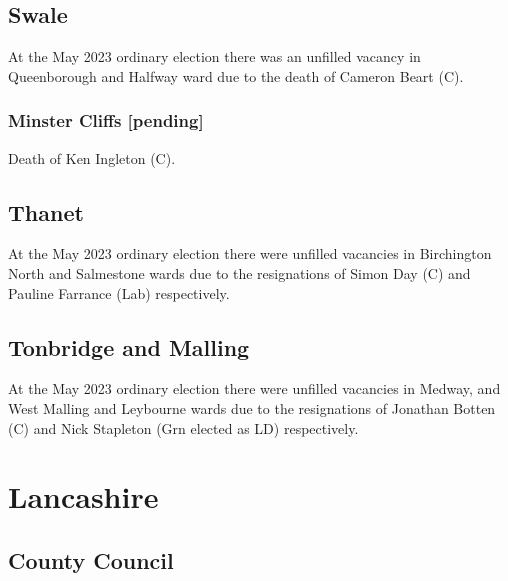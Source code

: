\documentclass[a4paper,openany]{book}
\begin{document}
\begin{resultsiii}
\subsection*{Swale}

At the May 2023 ordinary election there was an unfilled vacancy in Queenborough and Halfway ward due to the death of Cameron Beart (C).%

\subsubsection*{Minster Cliffs \hspace*{\fill}\nolinebreak[1]%
	\enspace\hspace*{\fill}
	[pending]}


Death of Ken Ingleton (C).

\subsection*{Thanet}

At the May 2023 ordinary election there were unfilled vacancies in Birchington North and Salmestone wards due to the resignations of Simon Day (C) and Pauline Farrance (Lab) respectively.%
%
%

\subsection*{Tonbridge and Malling}

At the May 2023 ordinary election there were unfilled vacancies in Medway, and West Malling and Leybourne wards due to the resignations of Jonathan Botten (C) and Nick Stapleton (Grn elected as LD) respectively.%
%

\section{Lancashire}

\subsection*{County Council}


\end{resultsiii}
\end{document}
